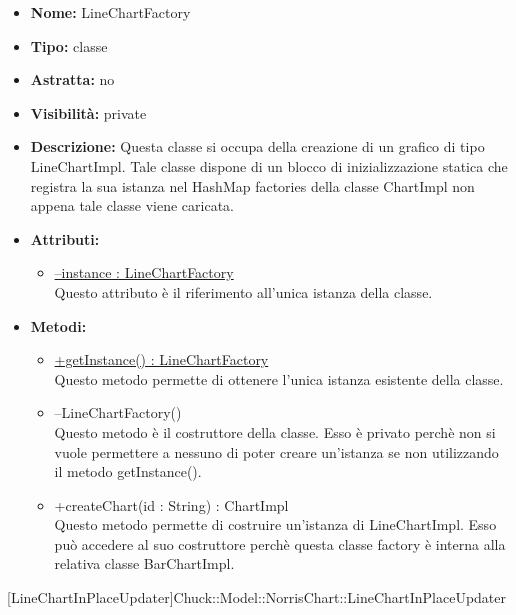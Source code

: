 			
			\begin{itemize}
			\item \textbf{Nome:} LineChartFactory
			\item \textbf{Tipo:} classe
			
		\item \textbf{Astratta:}
		no
			\item \textbf{Visibilità:} private
			\item \textbf{Descrizione:} Questa classe si occupa della creazione di un grafico di tipo LineChartImpl. Tale classe dispone di un blocco di inizializzazione statica che registra la sua istanza nel HashMap factories della classe ChartImpl non appena tale classe viene caricata.
			\item \textbf{Attributi:}
				\begin{itemize}
				\setlength{\itemsep}{5pt}
				
					\item[\ding{111}] \underline{--instance : LineChartFactory} \\ [1mm] Questo attributo è il riferimento all'unica istanza della classe.
				\end{itemize}
		
			\item \textbf{Metodi:}
				\begin{itemize}
				\setlength{\itemsep}{5pt}
				
					\item[\ding{111}] {\underline{+getInstance() : LineChartFactory}} \\ [1mm] Questo metodo permette di ottenere l'unica istanza esistente della classe.
					\item[\ding{111}] {{--LineChartFactory()}} \\ [1mm] Questo metodo è il costruttore della classe. Esso è privato perchè non si vuole permettere a nessuno di poter creare un’istanza se non utilizzando il metodo getInstance().
					\item[\ding{111}] {{+createChart(id : String) : ChartImpl}} \\ [1mm] Questo metodo permette di costruire un'istanza di LineChartImpl. Esso può accedere al suo costruttore perchè questa classe factory è interna alla relativa classe BarChartImpl.
				\end{itemize}
		
			\end{itemize}

			
			[LineChartInPlaceUpdater]{Chuck::Model::NorrisChart::LineChartInPlaceUpdater}
			

